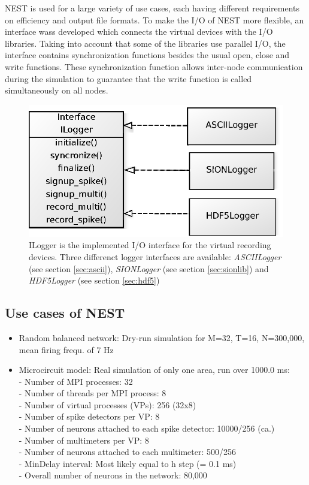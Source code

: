 \documentclass[]{YIC2015}
\begin{document}
NEST is used for a large variety of use cases, each having different
requirements on efficiency and output file formats. To make the I/O of
NEST more flexible, an interface wass developed which connects the
virtual devices with the I/O libraries. Taking into account that some
of the libraries use parallel I/O, the interface contains
synchronization functions besides the usual open, close and write
functions. These synchronization function allows inter-node
communication during the simulation to guarantee that the write
function is called simultaneously on all nodes.

\begin{figure}[htbp]
\centering %
\includegraphics[scale=0.5]{loggerinterface.eps}
\caption{ILogger is the implemented I/O interface for the virtual recording devices. 
Three differenct logger interfaces are available: \emph{ASCIILogger} (see section \ref{sec:ascii}),
\emph{SIONLogger} (see section \ref{sec:sionlib}) and \emph{HDF5Logger} (see section \ref{sec:hdf5})}
\label{fig:loggerinterface}
\end{figure}

\subsection{Use cases of NEST}

\begin{itemize}
  \item{Random balanced network: Dry-run simulation for M=32, T=16, N=300,000, mean firing frequ. of 7 Hz}
  \item{Microcircuit model: Real simulation of only one area, run over 1000.0 ms: \\
- Number of MPI processes: 32\\
- Number of threads per MPI process: 8\\
- Number of virtual processes (VPs): 256 (32x8)\\
- Number of spike detectors per VP: 8\\
- Number of neurons attached to each spike detector: 10000/256 (ca.)\\
- Number of multimeters per VP: 8\\
- Number of neurons attached to each multimeter: 500/256\\
- MinDelay interval: Most likely equal to h step (= 0.1 ms)\\
- Overall number of neurons in the network: 80,000}
\end{itemize}
\end{document}
